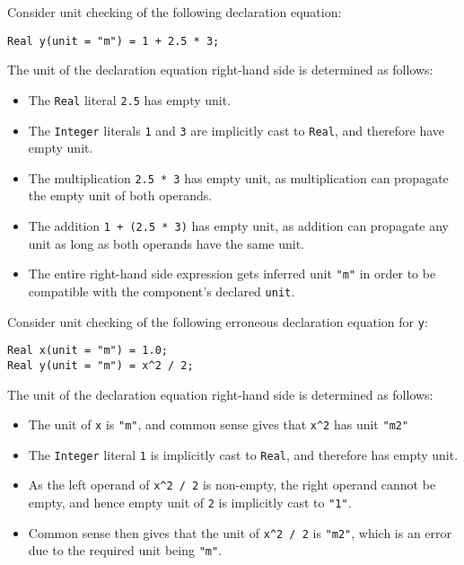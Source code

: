 \begin{example}
Consider unit checking of the following declaration equation:
\begin{lstlisting}[language=modelica]
Real y(unit = "m") = 1 + 2.5 * 3;
\end{lstlisting}
The unit of the declaration equation right-hand side is determined as follows:
\begin{itemize}
\item The \lstinline!Real! literal \lstinline!2.5! has empty unit.
\item The \lstinline!Integer! literals \lstinline!1! and \lstinline!3! are implicitly cast to \lstinline!Real!, and therefore have empty unit.
\item The multiplication \lstinline!2.5 * 3! has empty unit, as multiplication can propagate the empty unit of both operands.
\item The addition \lstinline!1 + (2.5 * 3)! has empty unit, as addition can propagate any unit as long as both operands have the same unit.
\item The entire right-hand side expression gets inferred unit \lstinline!"m"! in order to be compatible with the component's declared \lstinline!unit!.
\end{itemize}
\end{example}

\begin{example}
Consider unit checking of the following erroneous declaration equation for \lstinline!y!:
\begin{lstlisting}[language=modelica]
Real x(unit = "m") = 1.0;
Real y(unit = "m") = x^2 / 2;
\end{lstlisting}
The unit of the declaration equation right-hand side is determined as follows:
\begin{itemize}
\item The unit of \lstinline!x! is \lstinline!"m"!, and common sense gives that \lstinline!x^2! has unit \lstinline!"m2"!
\item The \lstinline!Integer! literal \lstinline!1! is implicitly cast to \lstinline!Real!, and therefore has empty unit.
\item As the left operand of \lstinline!x^2 / 2! is non-empty, the right operand cannot be empty, and hence empty unit of \lstinline!2! is implicitly cast to \lstinline!"1"!.
\item Common sense then gives that the unit of \lstinline!x^2 / 2! is \lstinline!"m2"!, which is an error due to the required unit being \lstinline!"m"!.
\end{itemize}
\end{example}

